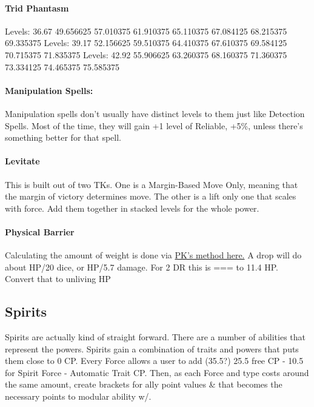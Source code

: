 \begin{multicols*}{2}
	\paragraph{Trid Phantasm}
	Levels: 36.67 49.656625 57.010375 61.910375 65.110375 67.084125 68.215375 69.335375
	Levels: 39.17 52.156625 59.510375 64.410375 67.610375 69.584125 70.715375 71.835375
	Levels: 42.92 55.906625 63.260375 68.160375 71.360375 73.334125 74.465375 75.585375
	
	\paragraph{Manipulation Spells:}
	
	Manipulation spells don't usually have distinct levels to them just like Detection Spells. Most of the time, they will gain +1 level of Reliable, +5\%, unless there's something better for that spell.
	
	\paragraph{Levitate}
	This is built out of two TKs. One is a Margin-Based Move Only, meaning that the margin of victory determines move. The other is a lift only one that scales with force. Add them together in stacked levels for the whole power.
	
	\paragraph{Physical Barrier}
	
	Calculating the amount of weight is done via \href{https://forums.sjgames.com/showpost.php?p=1936968&postcount=10}{PK's method here.}  A drop will do about HP/20 dice, or HP/5.7 damage. For 2 DR this is  === to 11.4 HP. Convert that to unliving HP
	
	\subsection{Spirits}
	
	Spirits are actually kind of straight forward. There are a number of abilities that represent the powers. Spirits gain a combination of traits and powers that puts them close to 0 CP. Every Force allows a user to add (35.5?) 25.5 free CP - 10.5 for Spirit Force - Automatic Trait CP.  Then, as each Force and type costs around the same amount, create brackets for ally point values \& that becomes the necessary points to modular ability w/.
	

\end{multicols*}
